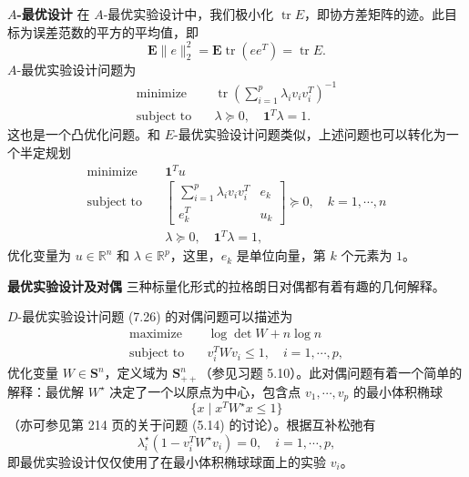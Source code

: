 \documentclass[UTF8, 12pt, fontset=fandol, oneside]{ctexart}
\begin{document}
\noindent\textbf{$A$-最优设计}\quad
在 $A$-最优实验设计中，我们极小化 $\operatorname{tr}E$，即协方差矩阵的迹。此目标为误差范数的平方的平均值，即
\[
\mathbf{E}\|e\|_2^2=\mathbf{E}\operatorname{tr}(ee^T)=\operatorname{tr}E.
\]
$A$-最优实验设计问题为
\begin{equation}
\begin{aligned}
\text{minimize}\quad & \operatorname{tr}\left(\sum_{i=1}^p\lambda_iv_iv_i^T\right)^{-1}\\
\text{subject to}\quad & \lambda\succeq 0,\quad \mathbf{1}^T\lambda=1.
\end{aligned}
\tag{7.28}
\end{equation}
这也是一个凸优化问题。和 $E$-最优实验设计问题类似，上述问题也可以转化为一个半定规划
\[
\begin{aligned}
\text{minimize}\quad & \mathbf{1}^Tu\\
\text{subject to}\quad &
\begin{bmatrix}
\sum_{i=1}^p\lambda_iv_iv_i^T & e_k\\
e_k^T & u_k
\end{bmatrix}\succeq 0,\quad k=1,\cdots,n\\
& \lambda\succeq 0,\quad \mathbf{1}^T\lambda=1,
\end{aligned}
\]
优化变量为 $u\in\mathbb{R}^n$ 和 $\lambda\in\mathbb{R}^p$，这里，$e_k$ 是单位向量，第 $k$ 个元素为 $1$。

\noindent\textbf{最优实验设计及对偶}\quad
三种标量化形式的拉格朗日对偶都有着有趣的几何解释。

$D$-最优实验设计问题 (7.26) 的对偶问题可以描述为
\[
\begin{aligned}
\text{maximize}\quad & \log\det W+n\log n\\
\text{subject to}\quad & v_i^TWv_i\leq 1,\quad i=1,\cdots,p,
\end{aligned}
\]
优化变量 $W\in\mathbf{S}^n$，定义域为 $\mathbf{S}_{++}^n$（参见习题 5.10）。此对偶问题有着一个简单的解释：最优解 $W^\star$ 决定了一个以原点为中心，包含点 $v_1,\cdots,v_p$ 的最小体积椭球
\[
\{x\mid x^TW^\star x\leq 1\}
\]
（亦可参见第 214 页的关于问题 (5.14) 的讨论）。根据互补松弛有
\begin{equation}
\lambda_i^\star(1-v_i^TW^\star v_i)=0,\quad i=1,\cdots,p,
\tag{7.29}
\end{equation}
即最优实验设计仅仅使用了在最小体积椭球球面上的实验 $v_i$。
\end{document}
